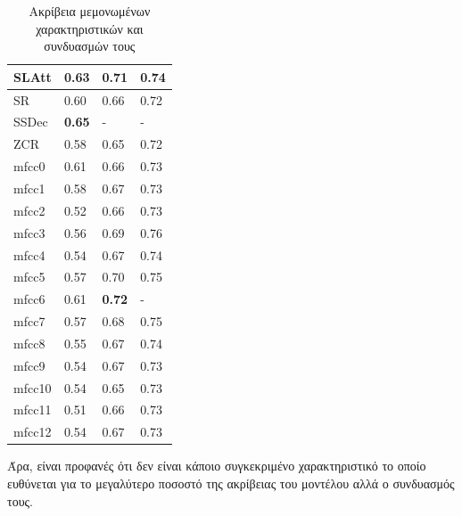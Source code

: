 \begin{table}[H]
\begin{tabular}{|l|l|l|l|}
SLAtt                   & 0.63                        & 0.71                       & 0.74                       \\\hline
SR                      & 0.60                        & 0.66                       & 0.72                       \\\hline
SSDec                   & \textbf{0.65}               & -                          & -                          \\\hline
ZCR                     & 0.58                        & 0.65                       & 0.72                       \\\hline
mfcc0                   & 0.61                        & 0.66                       & 0.73                       \\\hline
mfcc1                   & 0.58                        & 0.67                       & 0.73                       \\\hline
mfcc2                   & 0.52                        & 0.66                       & 0.73                       \\\hline
mfcc3                   & 0.56                        & 0.69                       & 0.76                       \\\hline
mfcc4                   & 0.54                        & 0.67                       & 0.74                       \\\hline
mfcc5                   & 0.57                        & 0.70                       & 0.75                       \\\hline
mfcc6                   & 0.61                        & \textbf{0.72}              & -                          \\\hline
mfcc7                   & 0.57                        & 0.68                       & 0.75                       \\\hline
mfcc8                   & 0.55                        & 0.67                       & 0.74                       \\\hline
mfcc9                   & 0.54                        & 0.67                       & 0.73                       \\\hline
mfcc10                  & 0.54                        & 0.65                       & 0.73                       \\\hline
mfcc11                  & 0.51                        & 0.66                       & 0.73                       \\\hline
mfcc12                  & 0.54                        & 0.67                       & 0.73                       \\\hline
\end{tabular}
\caption{Ακρίβεια μεμονωμένων χαρακτηριστικών και συνδυασμών τους}
\end{table}
Άρα, είναι προφανές ότι δεν είναι κάποιο συγκεκριμένο χαρακτηριστικό το οποίο ευθύνεται για το μεγαλύτερο ποσοστό της ακρίβειας του μοντέλου αλλά ο συνδυασμός τους.









